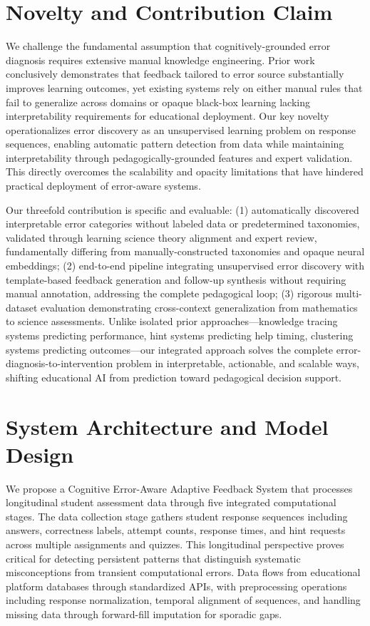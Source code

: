 \documentclass[conference]{IEEEtran}
\begin{document}
\section{Novelty and Contribution Claim}

We challenge the fundamental assumption that cognitively-grounded error diagnosis requires extensive manual knowledge engineering. Prior work conclusively demonstrates that feedback tailored to error source substantially improves learning outcomes, yet existing systems rely on either manual rules that fail to generalize across domains or opaque black-box learning lacking interpretability requirements for educational deployment. Our key novelty operationalizes error discovery as an unsupervised learning problem on response sequences, enabling automatic pattern detection from data while maintaining interpretability through pedagogically-grounded features and expert validation. This directly overcomes the scalability and opacity limitations that have hindered practical deployment of error-aware systems.

Our threefold contribution is specific and evaluable: (1) automatically discovered interpretable error categories without labeled data or predetermined taxonomies, validated through learning science theory alignment and expert review, fundamentally differing from manually-constructed taxonomies and opaque neural embeddings; (2) end-to-end pipeline integrating unsupervised error discovery with template-based feedback generation and follow-up synthesis without requiring manual annotation, addressing the complete pedagogical loop; (3) rigorous multi-dataset evaluation demonstrating cross-context generalization from mathematics to science assessments. Unlike isolated prior approaches—knowledge tracing systems predicting performance, hint systems predicting help timing, clustering systems predicting outcomes—our integrated approach solves the complete error-diagnosis-to-intervention problem in interpretable, actionable, and scalable ways, shifting educational AI from prediction toward pedagogical decision support.

\section{System Architecture and Model Design}

We propose a Cognitive Error-Aware Adaptive Feedback System that processes longitudinal student assessment data through five integrated computational stages. The data collection stage gathers student response sequences including answers, correctness labels, attempt counts, response times, and hint requests across multiple assignments and quizzes. This longitudinal perspective proves critical for detecting persistent patterns that distinguish systematic misconceptions from transient computational errors. Data flows from educational platform databases through standardized APIs, with preprocessing operations including response normalization, temporal alignment of sequences, and handling missing data through forward-fill imputation for sporadic gaps.
\end{document}
